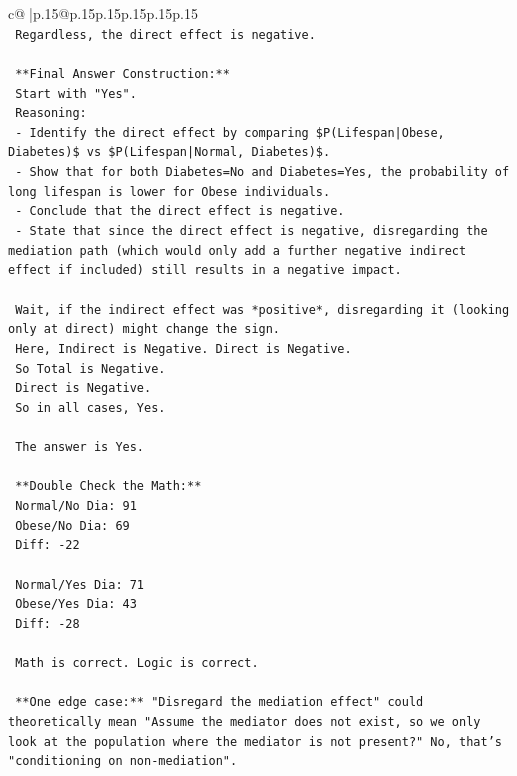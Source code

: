 \documentclass{article}
\begin{document}
{\begin{supertabular}{c@{$\;$}|p{.15\linewidth}@{}p{.15\linewidth}p{.15\linewidth}p{.15\linewidth}p{.15\linewidth}p{.15\linewidth}}
{{{\\ 
\texttt{    Regardless, the direct effect is negative.} \\
\\ 
\texttt{    **Final Answer Construction:**} \\
\texttt{    Start with "Yes".} \\
\texttt{    Reasoning:} \\
\texttt{    {-} Identify the direct effect by comparing \$P(Lifespan|Obese, Diabetes)\$ vs \$P(Lifespan|Normal, Diabetes)\$.} \\
\texttt{    {-} Show that for both Diabetes=No and Diabetes=Yes, the probability of long lifespan is lower for Obese individuals.} \\
\texttt{    {-} Conclude that the direct effect is negative.} \\
\texttt{    {-} State that since the direct effect is negative, disregarding the mediation path (which would only add a further negative indirect effect if included) still results in a negative impact.} \\
\\ 
\texttt{    Wait, if the indirect effect was *positive*, disregarding it (looking only at direct) might change the sign.} \\
\texttt{    Here, Indirect is Negative. Direct is Negative.} \\
\texttt{    So Total is Negative.} \\
\texttt{    Direct is Negative.} \\
\texttt{    So in all cases, Yes.} \\
\\ 
\texttt{    The answer is Yes.} \\
\\ 
\texttt{    **Double Check the Math:**} \\
\texttt{    Normal/No Dia: 91} \\
\texttt{    Obese/No Dia: 69} \\
\texttt{    Diff: {-}22} \\
\\ 
\texttt{    Normal/Yes Dia: 71} \\
\texttt{    Obese/Yes Dia: 43} \\
\texttt{    Diff: {-}28} \\
\\ 
\texttt{    Math is correct. Logic is correct.} \\
\\ 
\texttt{    **One edge case:** "Disregard the mediation effect" could theoretically mean "Assume the mediator does not exist, so we only look at the population where the mediator is not present?" No, that's "conditioning on non{-}mediation".} \\
}}}
\end{supertabular}}
\end{document}
